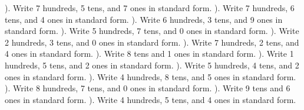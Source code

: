 \documentclass{article}%
\begin{document}
). Write 7 hundreds, 5 tens, and 7 ones in standard form.%
\newline%
\newline%
). Write 7 hundreds, 6 tens, and 4 ones in standard form.%
\newline%
\newline%
). Write 6 hundreds, 3 tens, and 9 ones in standard form.%
\newline%
\newline%
). Write 5 hundreds, 7 tens, and 0 ones in standard form.%
\newline%
\newline%
). Write 2 hundreds, 3 tens, and 0 ones in standard form.%
\newline%
\newline%
). Write 7 hundreds, 2 tens, and 4 ones in standard form.%
\newline%
\newline%
). Write 8 tens and 1 ones in standard form.%
\newline%
\newline%
). Write 1 hundreds, 5 tens, and 2 ones in standard form.%
\newline%
\newline%
). Write 5 hundreds, 4 tens, and 2 ones in standard form.%
\newline%
\newline%
). Write 4 hundreds, 8 tens, and 5 ones in standard form.%
\newline%
\newline%
). Write 8 hundreds, 7 tens, and 0 ones in standard form.%
\newline%
\newline%
). Write 9 tens and 6 ones in standard form.%
\newline%
\newline%
). Write 4 hundreds, 5 tens, and 4 ones in standard form.%
\end{document}
